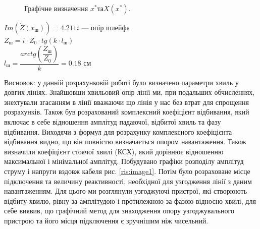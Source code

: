 \documentclass[a4paper,14pt]{extreport}
\begin{document}
\newpage
\begin{figure}
\caption{Графічне визначення $x^*та X(x^*)$.}
\label{ris:image2}
\end{figure}


$Im(\dot{Z}(x_{\text{ш}}))=4.211 i$ --- опір шлейфа\\

$Z_{\text{ш}} = i\cdot Z_0 \cdot tg(k\cdot l_{\text{ш}})$\\

$l_{\text{ш}} = \dfrac{arctg(\dfrac{Z_{\text{ш}}}{Z_0})}{k} = 0.18$ см



\newpage
\clearpage
Висновок: у данній розрахунковій роботі було визначено параметри хвиль у довгих лініях. Знайшовши хвильовий опір лінії ми, при подальших обчисленнях, знехтували згасанням в лінії вважаючи що лінія у нас без втрат для спрощення розрахунків. Також був розрахований комплексний коефіцієнт відбивання, який включає в себе відношення амплітуд падаючої, відбитої хвиль та фазу відбивання. Виходячи з формул для розрахунку комплексного коефіцієнта відбивання видно, що він повністю визначається опором навантаження. Також визначили коефіцієнт стоячої хвилі (КСХ), який дорівнює відношенню максимальної і мінімальної амплітуд. Побудувано графіки розподілу амплітуд струму і напруги вздовж кабеля рис. \ref{ris:image1}. Потім було розраховане місце підключення та величину реактивності, необхідної для узгодження лінії з даним навантаженням. Для цього ми розглянули узгоджуючі пристрої, які створюють відбиту хвилю, рівну за амплітудою і протилежною за фазою відносно хвилі, для себе виявив, що графічний метод для знаходження опору узгоджувального пристрою та його місця підключення є зручнішим ніж чисельний.\\





%
\end{document}
